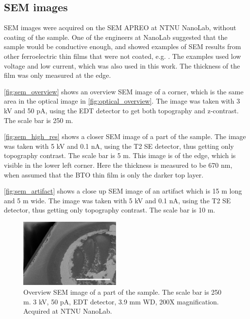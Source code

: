 \subsection{SEM images}
\label{results:SEM}

SEM images were acquired on the SEM APREO at NTNU NanoLab, without coating of the sample.
One of the engineers at NanoLab suggested that the sample would be conductive enough, and showed examples of SEM results from other ferroelectric thin films that were not coated, e.g. \cite{hunnestad_visualizing_2019}.
The examples used low voltage and low current, which was also used in this work.
The thickness of the film was only measured at the edge.

\autoref{fig:sem_overview} shows an overview SEM image of a corner, which is the same area in the optical image in \autoref{fig:optical_overview}.
The image was taken with 3 kV and 50 pA, using the EDT detector to get both topography and z-contrast.
The scale bar is 250 \textmu m.

\autoref{fig:sem_high_res} shows a closer SEM image of a part of the sample.
The image was taken with 5 kV and 0.1 nA, using the T2 SE detector, thus getting only topography contrast.
The scale bar is 5 \textmu m.
This image is of the edge, which is visible in the lower left corner.
Here the thickness is measured to be 670 nm, when assumed that the BTO thin film is only the darker top layer.

\autoref{fig:sem_artifact} shows a close up SEM image of an artifact which is 15 \textmu m long and 5 \textmu m wide.
The image was taken with 5 kV and 0.1 nA, using the T2 SE detector, thus getting only topography contrast.
The scale bar is 10 \textmu m.

\begin{figure}[ht]
    \centering
    \includegraphics[width=0.45\textwidth]{figures/sem_overview_250um.jpg}
    \caption{Overview SEM image of a part of the sample.
        The scale bar is 250 \textmu m.
        3 kV, 50 pA, EDT detector, 3.9 mm WD, 200X magnification.
        Acquired at NTNU NanoLab.
    }
    \label{fig:sem_overview}
\end{figure}

